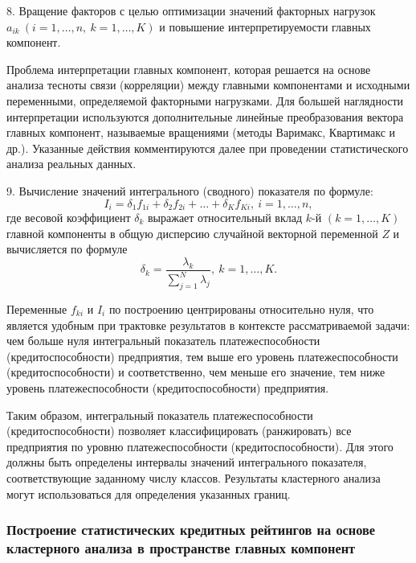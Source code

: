 \documentclass[14pt,a4paper]{extarticle}
\begin{document}
8. Вращение факторов с целью оптимизации значений факторных нагрузок $a_{ik}\ (i=1,\ldots,n,\ k=1,\ldots,K)$ и повышение интерпретируемости главных компонент.

Проблема интерпретации главных компонент, которая решается на основе анализа тесноты связи (корреляции) между главными компонентами и исходными переменными, определяемой факторными нагрузками. Для большей наглядности интерпретации используются дополнительные линейные преобразования вектора главных компонент, называемые вращениями (методы Варимакс, Квартимакс и др.). Указанные действия комментируются далее при проведении статистического анализа реальных данных.

9. Вычисление значений интегрального (сводного) показателя по формуле:
\begin{equation}
I_{i} = \delta_{1} f_{1i} + \delta_{2} f_{2i} + \ldots + \delta_{K} f_{Ki},\ i=1,\ldots,n,
\end{equation}
где весовой коэффициент $\delta_{k}$ выражает относительный вклад $k$-й $(k=1,\ldots,K)$ главной компоненты в общую дисперсию случайной векторной переменной $Z$ и вычисляется по формуле
\begin{equation}
\delta_{k} = \frac{\lambda_{k}}{\sum_{j=1}^{N} \lambda_{j}},\ k=1,\ldots,K.
\end{equation}

Переменные $f_{ki}$ и $I_{i}$ по построению центрированы относительно нуля, что является удобным при трактовке результатов в контексте рассматриваемой задачи: чем больше нуля интегральный показатель платежеспособности (кредитоспособности) предприятия, тем выше его уровень платежеспособности (кредитоспособности) и соответственно, чем меньше его значение, тем ниже уровень платежеспособности (кредитоспособности) предприятия.

Таким образом, интегральный показатель платежеспособности (кредитоспособности) позволяет классифицировать (ранжировать) все предприятия по уровню платежеспособности (кредитоспособности). Для этого должны быть определены интервалы значений интегрального показателя, соответствующие заданному числу классов. Результаты кластерного анализа могут использоваться для определения указанных границ.

\subsubsection{Построение статистических кредитных рейтингов на основе кластерного анализа в пространстве главных компонент}
\end{document}
